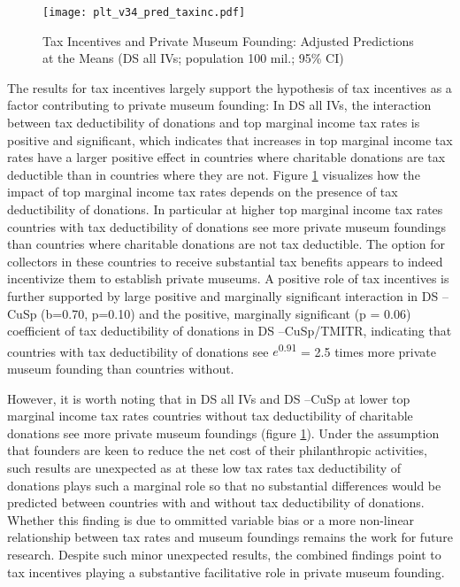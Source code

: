 \documentclass[11pt, authoryear]{elsarticle}
\begin{document}
\begin{figure}[htbp]
\centering
\texttt{[image: plt\_v34\_pred\_taxinc.pdf]}
\caption{\label{fig:pred_taxinc}Tax Incentives and Private Museum Founding: Adjusted Predictions at the Means (DS all IVs; population 100 mil.; 95\% CI)}
\end{figure}

The results for tax incentives largely support the hypothesis of tax incentives as a factor contributing to private museum founding:
In DS all IVs, the interaction between tax deductibility of donations and top marginal income tax rates is positive and significant, which indicates that increases in top marginal income tax rates have a larger positive effect in countries where charitable donations are tax deductible than in countries where they are not.
Figure \ref{fig:pred_taxinc} visualizes how the impact of top marginal income tax rates depends on the presence of tax deductibility of donations.
In particular at higher top marginal income tax rates countries with tax deductibility of donations see more private museum foundings than countries where charitable donations are not tax deductible.
The option for collectors in these countries to receive substantial tax benefits appears to indeed incentivize them to establish private museums.
A positive role of tax incentives is further supported by large positive and marginally significant interaction in DS --CuSp (b=0.70, p=0.10) and the positive, marginally significant (p = 0.06) coefficient of tax deductibility of donations in DS --CuSp/TMITR, indicating that countries with tax deductibility of donations see \(e\)\textsuperscript{0.91} = 2.5 times more private museum founding than countries without. 




However, it is worth noting that in DS all IVs and DS --CuSp at lower top marginal income tax rates countries without tax deductibility of charitable donations see more private museum foundings (figure \ref{fig:pred_taxinc}).
Under the assumption that founders are keen to reduce the net cost of their philanthropic activities, such results are unexpected as at these low tax rates tax deductibility of donations plays such a marginal role so that no substantial differences would be predicted between countries with and without tax deductibility of donations.  
Whether this finding is due to ommitted variable bias or a more non-linear relationship between tax rates and museum foundings remains the work for future research.
Despite such minor unexpected results, the combined findings point to tax incentives playing a substantive facilitative role in private museum founding. 
\end{document}
